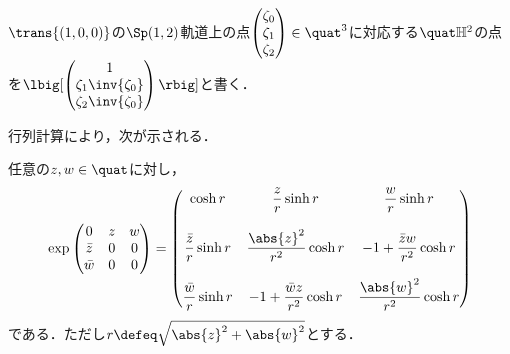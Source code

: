 \begin{nttdef}
  $\trans{(1,0,0)} $の$\Sp(1,2)$軌道上の点$
  \begin{pmatrix}
    \zeta_0 \\ \zeta_1 \\ \zeta_2 
  \end{pmatrix}
  \in \quat^3 $に対応する$\quat\mathbb{H}^2$の点を$\lbig[
  \begin{pmatrix}
    1 \\ \zeta_1\inv{\zeta_0} \\ \zeta_2 \inv{\zeta_0}
  \end{pmatrix}\rbig]
  $と書く．
  
\end{nttdef}

行列計算により，次が示される．
\begin{lem}\label{lem:exp-quat}
  
  任意の$ z,w\in \quat$に対し，
  \begin{align*}
    \exp
    \begin{pmatrix}
      0 & z & w  \\
      \bar{z} & 0 & 0\\
      \bar{w} & 0 & 0
    \end{pmatrix}
                    =
                    \begin{pmatrix}
                      \cosh r &  \dfrac{z}{r} \sinh r & \dfrac{w}{r}\sinh r \\
                      \\
                      \dfrac{\bar{z}}{r} \sinh r & \dfrac{\abs{z}^2}{r^2} \cosh r & -1+ \dfrac{\bar{z}w}{r^2}\cosh r \\
                      \\
                      \dfrac{\bar{w}}{r}\sinh r &  -1+ \dfrac{\bar{w}z}{r^2}\cosh r & \dfrac{\abs{w}^2}{r^2} \cosh r
                    \end{pmatrix}
  \end{align*}
  である．ただし$r \defeq \sqrt{\abs{z}^2 + \abs{w}^2 } $とする．
\end{lem}

